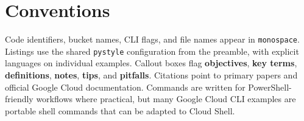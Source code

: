 \section*{Conventions}
Code identifiers, bucket names, CLI flags, and file names appear in \texttt{monospace}. Listings use the shared \texttt{pystyle} configuration from the preamble, with explicit languages on individual examples. Callout boxes flag \textbf{objectives}, \textbf{key terms}, \textbf{definitions}, \textbf{notes}, \textbf{tips}, and \textbf{pitfalls}. Citations point to primary papers and official Google Cloud documentation. Commands are written for PowerShell-friendly workflows where practical, but many Google Cloud CLI examples are portable shell commands that can be adapted to Cloud Shell.
